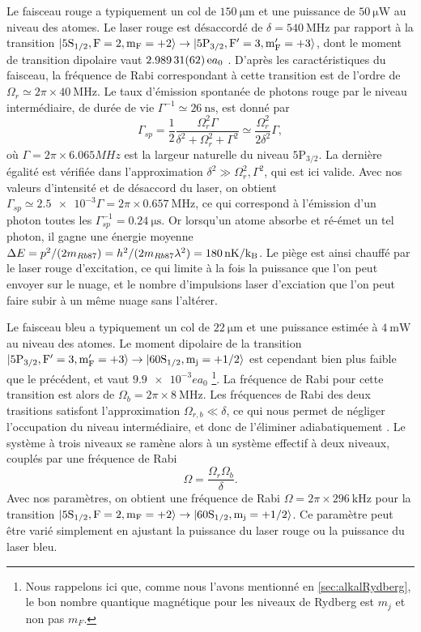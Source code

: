 Le faisceau rouge a typiquement un col de $\SI{150}{\um}$ et une puissance de $\SI{50}{\micro\watt}$ au niveau des atomes.
Le laser rouge est désaccordé de $\delta=\SI{540}{\MHz}$ par rapport à la transition $ \ket{\mathrm{5S_{1/2},F=2,m_F=+2}} \rightarrow \ket{\mathrm{5P_{3/2},F'=3,m_F'=+3}}$, dont le moment de transition dipolaire vaut $\SI{2.98931 (62)} ea_0$ \cite{DATA_STECKRB87}.
D'après les caractéristiques du faisceau, la fréquence de Rabi correspondant à cette transition est de l'ordre de $\Omega_r \simeq 2\pi\times \SI{40}{\MHz}$.
Le taux d'émission spontanée de photons rouge par le niveau intermédiaire, de durée de vie $\Gamma^{-1} \simeq \SI{26}{\ns}$, est donné par
\begin{equation}
\label{eq:scattering_5P3/2}
\Gamma_{sp} = \frac{1}{2} \frac{\Omega_r^2 \Gamma}{\delta^2 + \Omega_r^2 + \Gamma^2}
\simeq \frac{\Omega_r^2}{2\delta^2} \Gamma,
\end{equation}
où $\Gamma = 2\pi \times 6.065 MHz$ est la largeur naturelle du niveau $\mathrm{5P_{3/2}}$.
La dernière égalité est vérifiée dans l'approximation $\delta^2 \gg \Omega_r^2, \Gamma^2$, qui est ici valide.
Avec nos valeurs d'intensité et de désaccord du laser, on obtient $\Gamma_{sp} \simeq \num{2.5e-3} \Gamma = 2\pi\times \SI{0.657}{\MHz}$, ce qui correspond à l'émission d'un photon  toutes les $\Gamma_{sp}^{-1} = \SI{0.24}{\us}$.
Or lorsqu'un atome absorbe et ré-émet un tel photon, il gagne une énergie moyenne
$\Delta E = p^2/(2m_{Rb87}) = h^2/(2m_{Rb87} \lambda^2) = \SI{180}{\nano\kelvin} / \mathrm{k_B}$.
Le piège est ainsi chauffé par le laser rouge d'excitation, ce qui limite à la fois la puissance que l'on peut envoyer sur le nuage, et le nombre d'impulsions laser d'exciation que l'on peut faire subir à un même nuage sans l'altérer.

Le faisceau bleu a typiquement un col de $\SI{22}{\um}$ et une puissance estimée à $\SI{4}{\milli\watt}$ au niveau des atomes.
Le moment dipolaire de la transition $ \ket{\mathrm{5P_{3/2},F'=3,m_F'=+3}} \rightarrow \ket{\mathrm{60S_{1/2},m_j=+1/2}}$ est cependant bien plus faible que le précédent, et vaut $\SI{9.9e-3} ea_0$
\footnote{Nous rappelons ici que, comme nous l'avons mentionné en \ref{sec:alkalRydberg}, le bon nombre quantique magnétique pour les niveaux de Rydberg est $m_j$ et non pas $m_F$.}.
La fréquence de Rabi pour cette transition est alors de $\Omega_b = 2\pi\times \SI{8}{\MHz}$.
Les fréquences de Rabi des deux trasitions satisfont l'approximation $\Omega_{r,b} \ll \delta$, ce qui nous permet de négliger l'occupation du niveau intermédiaire, et donc de l'éliminer adiabatiquement \cite{TXT_ASPECTFABRE_QUANTOPT}.
Le système à trois niveaux se ramène alors à un système effectif à deux niveaux, couplés par une fréquence de Rabi
\begin{equation}
\label{eq:Rabi_2photons}
\Omega = \frac{\Omega_r \Omega_b}{\delta}.
\end{equation}
Avec nos paramètres, on obtient une fréquence de Rabi $\Omega = 2\pi \times \SI{296}{\kHz}$ pour la transition $\ket{\mathrm{5S_{1/2},F=2,m_F=+2}} \rightarrow \ket{\mathrm{60S_{1/2},m_j=+1/2}}$.
Ce paramètre peut être varié simplement en ajustant la puissance du laser rouge ou la puissance du laser bleu.

